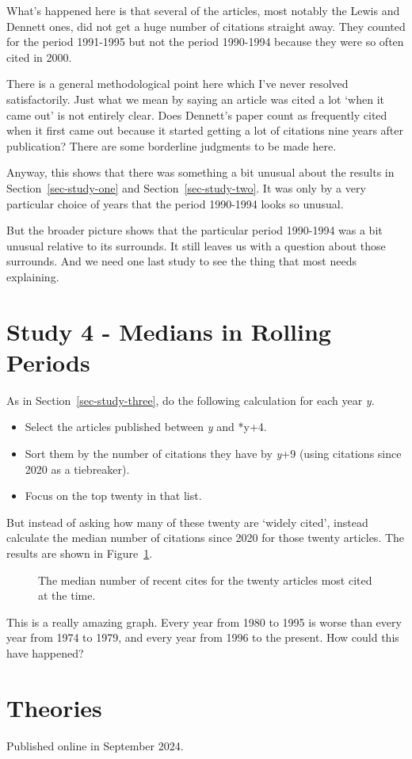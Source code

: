 \documentclass[
  10pt,
  letterpaper,
  DIV=11,
  numbers=noendperiod,
  twoside]{scrartcl}
\providecommand{\tightlist}{%
  \setlength{\itemsep}{0pt}\setlength{\parskip}{0pt}}\usepackage{longtable,booktabs,array}
\begin{document}
What's happened here is that several of the articles, most notably the
Lewis and Dennett ones, did not get a huge number of citations straight
away. They counted for the period 1991-1995 but not the period 1990-1994
because they were so often cited in 2000.

There is a general methodological point here which I've never resolved
satisfactorily. Just what we mean by saying an article was cited a lot
`when it came out' is not entirely clear. Does Dennett's paper count as
frequently cited when it first came out because it started getting a lot
of citations nine years after publication? There are some borderline
judgments to be made here.

Anyway, this shows that there was something a bit unusual about the
results in Section~\ref{sec-study-one} and Section~\ref{sec-study-two}.
It was only by a very particular choice of years that the period
1990-1994 looks so unusual.

But the broader picture shows that the particular period 1990-1994 was a
bit unusual relative to its surrounds. It still leaves us with a
question about those surrounds. And we need one last study to see the
thing that most needs explaining.

\section{Study 4 - Medians in Rolling Periods}\label{sec-study-four}

As in Section~\ref{sec-study-three}, do the following calculation for
each year \emph{y}.

\begin{itemize}
\tightlist
\item
  Select the articles published between \emph{y} and *y+4.
\item
  Sort them by the number of citations they have by \emph{y}+9 (using
  citations since 2020 as a tiebreaker).
\item
  Focus on the top twenty in that list.
\end{itemize}

But instead of asking how many of these twenty are `widely cited',
instead calculate the median number of citations since 2020 for those
twenty articles. The results are shown in Figure~\ref{fig-all-median}.

\begin{figure}


\caption{\label{fig-all-median}The median number of recent cites for the
twenty articles most cited at the time.}

\end{figure}%

This is a really amazing graph. Every year from 1980 to 1995 is worse
than every year from 1974 to 1979, and every year from 1996 to the
present. How could this have happened?

\section{Theories}\label{sec-theories}



\noindent Published online in September 2024.
\end{document}
